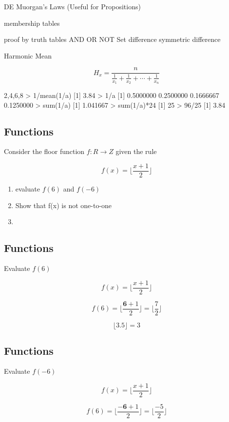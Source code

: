 \documentclass[]{report}
\begin{document}
DE Muorgan's Laws (Useful for Propositions)

membership tables

proof by truth tables
AND
OR
NOT
Set difference
symmetric difference



\newpage


Harmonic Mean

\[ H_x = \frac{ n }{ \frac{ 1 }{ x_1 } + \frac{ 1 }{ x_2 } + \cdots + \frac{ 1 }{ x_n } } \]

2,4,6,8
> 1/mean(1/a)
[1] 3.84
> 1/a
[1] 0.5000000 0.2500000 0.1666667 0.1250000
> sum(1/a)
[1] 1.041667
> sum(1/a)*24
[1] 25
> 96/25
[1] 3.84



\subsection{Functions}
Consider the floor function $f : R \rightarrow Z$ given the rule

\[ f(x) = \lfloor \frac{x+1}{2} \rfloor \]

\begin{enumerate}
\item evaluate $f(6)$ and $f(-6)$
\item Show that f(x) is not one-to-one
\item 
\end{enumerate}


\subsection{Functions}
Evaluate $f(6)$ 


\[ f(x) = \lfloor \frac{x+1}{2} \rfloor \]


\[ f(6) = \lfloor \frac{\boldsymbol{6}+1}{2}\rfloor = \lfloor  \frac{7}{2}\rfloor\]


\[  \lfloor 3.5 \rfloor  = 3  \]



\subsection{Functions}
Evaluate $f(-6)$ 


\[ f(x) = \lfloor \frac{x+1}{2} \rfloor \]


\[ f(6) = \lfloor \frac{\boldsymbol{-6}+1}{2}\rfloor = \lfloor  \frac{-5}{2}\rfloor\]
\end{document}
